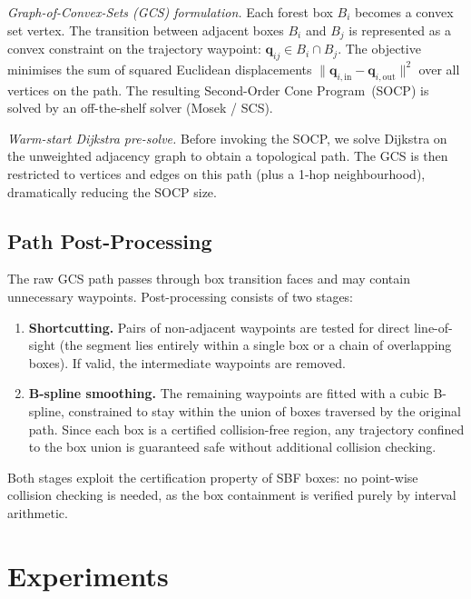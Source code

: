 \documentclass[journal]{IEEEtran}
\begin{document}
\emph{Graph-of-Convex-Sets (GCS) formulation.}
Each forest box $B_i$ becomes a convex set vertex.
The transition between adjacent boxes $B_i$ and $B_j$ is
represented as a convex constraint on the trajectory waypoint:
$\bm{q}_{ij} \in B_i \cap B_j$.
The objective minimises the sum of squared Euclidean
displacements $\|\bm{q}_{i,\text{in}} - \bm{q}_{i,\text{out}}\|^2$
over all vertices on the path.
The resulting Second-Order Cone Program~(SOCP) is solved by an
off-the-shelf solver (Mosek / SCS).

\emph{Warm-start Dijkstra pre-solve.}
Before invoking the SOCP, we solve Dijkstra on the
unweighted adjacency graph to obtain a topological path.
The GCS is then restricted to vertices and edges on this
path (plus a 1-hop neighbourhood), dramatically reducing
the SOCP size.

\subsection{Path Post-Processing}\label{sec:post_process}

The raw GCS path passes through box transition faces
and may contain unnecessary waypoints.
Post-processing consists of two stages:
\begin{enumerate}
  \item \textbf{Shortcutting.}  Pairs of non-adjacent waypoints
    are tested for direct line-of-sight (the segment lies entirely
    within a single box or a chain of overlapping boxes).
    If valid, the intermediate waypoints are removed.
  \item \textbf{B-spline smoothing.}  The remaining waypoints are
    fitted with a cubic B-spline, constrained to stay within the
    union of boxes traversed by the original path.
    Since each box is a certified collision-free region,
    any trajectory confined to the box union is guaranteed safe
    without additional collision checking.
\end{enumerate}
Both stages exploit the certification property of SBF boxes:
no point-wise collision checking is needed, as the box containment
is verified purely by interval arithmetic.

\section{Experiments}\label{sec:experiments}
\end{document}
